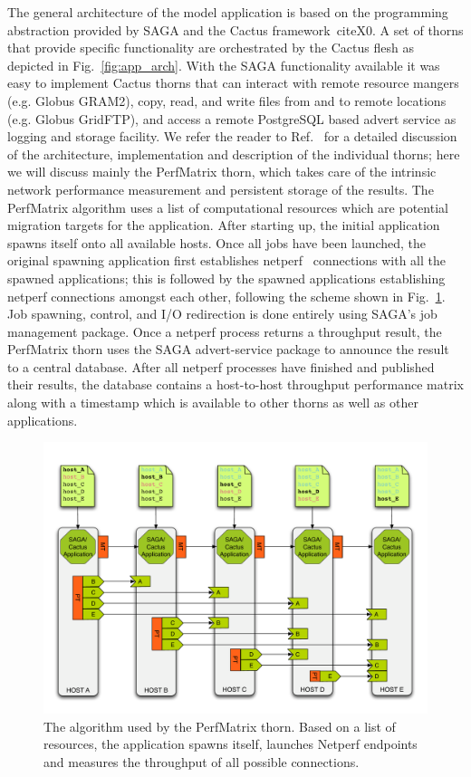 \documentclass[conference,final]{IEEEtran}
\newcommand{\upup}{\vspace*{-1em}}
\begin{document}
The general architecture of the model application is based on the
programming abstraction provided by SAGA and the Cactus
framework~cite{X0}.  A set of thorns that provide specific
functionality are orchestrated by the Cactus flesh as depicted in
Fig.~\ref{fig:app_arch}.  With the SAGA functionality available it was
easy to implement Cactus thorns that can interact with remote resource
mangers (e.g. Globus GRAM2), copy, read, and write files from and to
remote locations (e.g.  Globus GridFTP), and access a remote
PostgreSQL based advert service as logging and storage facility. We
refer the reader to Ref.~\cite{saga_escience2007} for a detailed
discussion of the architecture, implementation and description of the
individual thorns; here we will discuss mainly the PerfMatrix thorn,
which takes care of the intrinsic network performance measurement and
persistent storage of the results.
 The PerfMatrix algorithm uses a list
of computational resources which are potential migration targets for
the application. After starting up, the initial application spawns
itself onto all available hosts.  Once all jobs have been launched,
the original spawning application first establishes netperf~\cite{netperf_url}
connections with all the spawned applications; this is followed by the
spawned applications establishing netperf connections amongst each
other, following the scheme shown in Fig.~\ref{fig:algo}.  Job
spawning, control, and I/O redirection is done entirely using SAGA's
job management package.  Once a netperf process returns a throughput
result, the PerfMatrix thorn uses the SAGA advert-service package to
announce the result to a central database. After all netperf processes
have finished and published their results, the database contains a
host-to-host throughput performance matrix along with a timestamp
which is available to other thorns as well as other applications.
\begin{figure}
\begin{center}
\includegraphics[scale=0.30]{../diagrams/figure_01}
\end{center}
\caption{The algorithm used by the PerfMatrix thorn. Based on a list
  of resources, the application spawns itself, launches Netperf
  endpoints and measures the throughput of all possible connections.\upup}
\label{fig:algo}
\end{figure}
\end{document}
